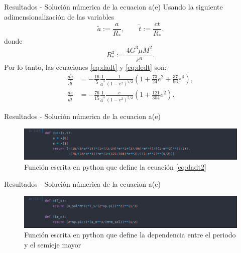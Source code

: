 \begin{frame}{Resultados - Solución númerica de la ecuacion a(e)}
    Usando la siguiente adimensionalización \cite{Vito2008,Gonzalez2018,Gonz2019} de las variables
\begin{equation*}
    \tilde{a}:= \frac{a}{R_*}, \qquad  \tilde{t}:=\frac{ct}{R_*}.
\end{equation*}
donde
\begin{equation*}
    R_*^3 := \frac{4G^3\mu M^2}{c^6}.
\end{equation*}
Por lo tanto, las ecuaciones \ref{eq:dadt} y \ref{eq:dedt} son:
\begin{align}
    \label{eq:dadt2}
    \frac{d\tilde{a}}{d\tilde{t}} &= -\frac{16}{5}\frac{1}{\tilde{a}^3}\frac{1}{\left(1-e^2\right)^{7/2}}\left(1+\frac{73}{24}e^2+\frac{37}{96}e^4\right) ,\\
    \label{eq:dedt2}
\frac{de}{d\tilde{t}} &= -\frac{76}{15}\frac{1}{\tilde{a}^4}\frac{e}{\left(1-e^2\right)^{5/2}}\left(1+\frac{121}{304}e^2\right) .
\end{align}
\end{frame}
\begin{frame}{Resultados - Solución númerica de la ecuacion a(e)}
    \begin{figure}[H]
        \includegraphics[scale=0.4]{images/dot.png}
        \caption{Función escrita en python que define la ecuación \ref{eq:dadt2} }
    \end{figure}
\end{frame}
\begin{frame}{Resultados - Solución númerica de la ecuacion a(e)}
    \begin{figure}[H]
        \includegraphics[scale=0.4]{images/fun.png}
        \caption{Función escrita en python que define la dependencia entre el periodo y el semieje mayor}
    \end{figure}
\end{frame}
